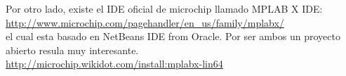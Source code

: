 Por otro lado, existe el IDE oficial de microchip llamado MPLAB X IDE:\\
\url{http://www.microchip.com/pagehandler/en_us/family/mplabx/}\\
el cual esta basado en NetBeans IDE from Oracle. Por ser ambos un proyecto
abierto resula muy interesante.\\
\url{http://microchip.wikidot.com/install:mplabx-lin64}



